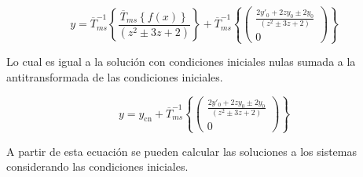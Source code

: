 \documentclass[12pt]{article}
\begin{document}
$$
y = \overline{T}_{ms}^{-1}\left\{\frac{\overline{T}_{ms}\left\{f(x)\right\} }{(z^2 \pm 3z +2)}\right\}
+\overline{T}_{ms}^{-1}\left\{\begin{pmatrix}
\frac{2y'_0 + 2z y_0 \pm 2y_0}{(z^2 \pm 3z +2)} \\[0.3 cm]
0
\end{pmatrix}\right\}
$$

Lo cual es igual a la solución con condiciones iniciales nulas sumada a la antitransformada de las condiciones iniciales.

$$
y = y_{\textrm{cn}}
+\overline{T}_{ms}^{-1}\left\{\begin{pmatrix}
\frac{2y'_0 + 2z y_0 \pm 2y_0}{(z^2 \pm 3z +2)} \\[0.3 cm]
0
\end{pmatrix}\right\}
$$

A partir de esta ecuación se pueden calcular las soluciones a los sistemas considerando las condiciones iniciales.
\end{document}
